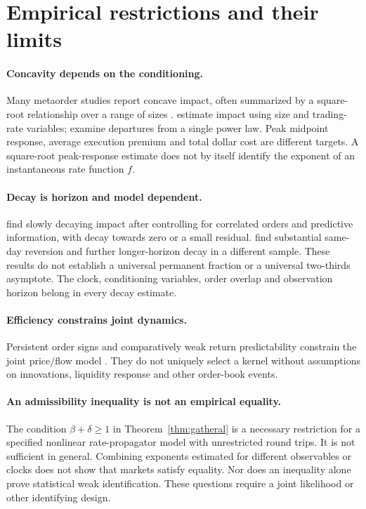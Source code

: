 \documentclass[11pt]{article}
\numberwithin{equation}{section}
\theoremstyle{definition}
\theoremstyle{remark}
\theoremstyle{definition}
\begin{document}
\section{Empirical restrictions and their limits}\label{sec:empirics}

\paragraph{Concavity depends on the conditioning.}
Many metaorder studies report concave impact, often summarized by a square-root
relationship over a range of sizes \citep{toth2011,bershova2013}.
\citet{almgren2005} estimate impact using size and trading-rate variables;
\citet{zarinelli2015} examine departures from a single power law. Peak midpoint
response, average execution premium and total dollar cost are different targets.
A square-root peak-response estimate does not by itself identify the exponent of
an instantaneous rate function $f$.

\paragraph{Decay is horizon and model dependent.}
\citet{brokmann2015} find slowly decaying impact after controlling for correlated
orders and predictive information, with decay towards zero or a small residual.
\citet{bucci2018} find substantial same-day reversion and further longer-horizon
decay in a different sample. These results do not establish a universal permanent
fraction or a universal two-thirds asymptote. The clock, conditioning variables,
order overlap and observation horizon belong in every decay estimate.

\paragraph{Efficiency constrains joint dynamics.}
Persistent order signs and comparatively weak return predictability constrain the
joint price/flow model \citep{bouchaud2004,bouchaud2018}. They do not uniquely
select a kernel without assumptions on innovations, liquidity response and other
order-book events.

\paragraph{An admissibility inequality is not an empirical equality.}
The condition $\beta+\delta\geq1$ in Theorem~\ref{thm:gatheral} is a necessary
restriction for a specified nonlinear rate-propagator model with unrestricted
round trips. It is not sufficient in general. Combining exponents estimated for
different observables or clocks does not show that markets satisfy equality.
Nor does an inequality alone prove statistical weak identification. These
questions require a joint likelihood or other identifying design.
\end{document}

